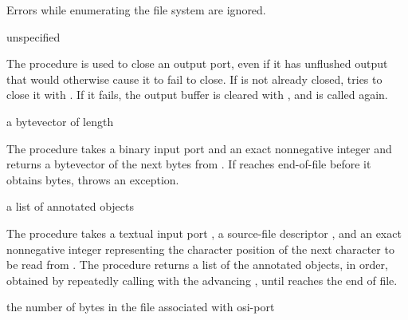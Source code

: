 Errors while enumerating the file system are ignored.

\begin{procedure}
\end{procedure}
\returns{} unspecified

The  procedure is used to close an
output port, even if it has unflushed output that would otherwise
cause it to fail to close.  If  is not already closed,
 tries to close it with
. If it fails, the output buffer is
cleared with , and
 is called again.

\begin{procedure}
\end{procedure}
\returns{} a bytevector of length 

The  procedure takes a binary input
port  and an exact nonnegative integer  and
returns a bytevector of the next  bytes from .
If  reaches end-of-file before it obtains  bytes,
 throws an 
exception.

\begin{procedure}
\end{procedure}
\returns{} a list of annotated objects

The  procedure takes a textual input
port , a source-file descriptor , and an exact
nonnegative integer  representing the character position of
the next character to be read from . The procedure returns a
list of the annotated objects, in order, obtained by repeatedly
calling  with the advancing ,
until  reaches the end of file.

\begin{procedure}
\end{procedure}
\returns{} the number of bytes in the file associated with osi-port 

